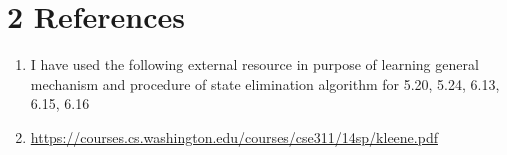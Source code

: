 \documentclass[10pt]{article}
\begin{document}
\begin{enumerate}[label={}]
\end{enumerate}

\newpage

\section*{2 \quad References}

\begin{enumerate}[label={}]

      \item I have used the following external resource in purpose of learning general mechanism and procedure of state elimination algorithm for 5.20, 5.24, 6.13, 6.15, 6.16
      \item \url{https://courses.cs.washington.edu/courses/cse311/14sp/kleene.pdf}


\end{enumerate}
\end{document}
